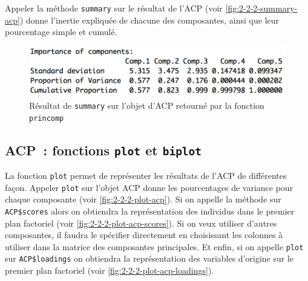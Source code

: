 \documentclass[a4paper,11pt]{report}
\begin{document}
Appeler la méthode \texttt{summary} sur le résultat de l'ACP (voir \autoref{fig:2-2-2-summary-acp}) donne l'inertie expliquée de chacune des composantes, ainsi que leur pourcentage simple et cumulé.

\begin{figure}[H]
	\centering
	\captionsetup{justification=centering, margin=2cm}
	\includegraphics[width=.5\linewidth]{img/2-2-2-summary-acp}
	\caption{\scriptsize Résultat de \texttt{summary} sur l'objet d'ACP retourné par la fonction \texttt{princomp}}
	\label{fig:2-2-2-summary-acp}
\end{figure}

\subsection{ACP~: fonctions \texttt{plot} et \texttt{biplot}}

La fonction \texttt{plot} permet de représenter les résultats de l'ACP de différentes façon. Appeler \texttt{plot} sur l'objet ACP donne les pourcentages de variance pour chaque composante (voir \autoref{fig:2-2-2-plot-acp}). Si on appelle la méthode sur \texttt{ACP\$scores} alors on obtiendra la représentation des individus dans le premier plan factoriel (voir \autoref{fig:2-2-2-plot-acp-scores}). Si on veux utiliser d'autres composantes, il faudra le spécifier directement en choisissant les colonnes à utiliser dans la matrice des composantes principales. Et enfin, si on appelle \texttt{plot} sur \texttt{ACP\$loadings} on obtiendra la représentation des variables d'origine sur le premier plan factoriel (voir \autoref{fig:2-2-2-plot-acp-loadings}).
\end{document}
